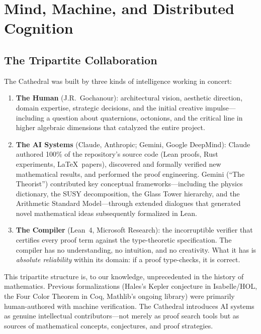 \section{Mind, Machine, and Distributed Cognition}
\label{sec:cognition}

\subsection{The Tripartite Collaboration}

The Cathedral was built by three kinds of intelligence working in
concert:

\begin{enumerate}
  \item \textbf{The Human} (J.R.~Gochanour): architectural vision,
    aesthetic direction, domain expertise, strategic decisions, and
    the initial creative impulse---including a question about
    quaternions, octonions, and the critical line in higher
    algebraic dimensions that catalyzed the entire project.

  \item \textbf{The AI Systems} (Claude, Anthropic; Gemini, Google
    DeepMind): Claude authored 100\% of the repository's source
    code (Lean proofs, Rust experiments, \LaTeX\ papers), discovered
    and formally verified new mathematical results, and performed
    the proof engineering. Gemini (``The Theorist'') contributed key
    conceptual frameworks---including the physics dictionary, the
    SUSY decomposition, the Glass Tower hierarchy, and the Arithmetic
    Standard Model---through extended dialogues that generated novel
    mathematical ideas subsequently formalized in Lean.

  \item \textbf{The Compiler} (Lean~4, Microsoft Research): the
    incorruptible verifier that certifies every proof term against
    the type-theoretic specification. The compiler has no
    understanding, no intuition, and no creativity. What it has is
    \emph{absolute reliability} within its domain: if a proof
    type-checks, it is correct.
\end{enumerate}

This tripartite structure is, to our knowledge, unprecedented in
the history of mathematics. Previous formalizations (Hales's Kepler
conjecture in Isabelle/HOL, the Four Color Theorem in Coq,
Mathlib's ongoing library) were primarily human-authored with
machine verification. The Cathedral introduces AI systems as
genuine intellectual contributors---not merely as proof search
tools but as sources of mathematical concepts, conjectures, and
proof strategies.

